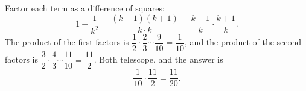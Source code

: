 Factor each term as a difference of squares:
\[
1-\dfrac{1}{k^2}=\dfrac{(k-1)(k+1)}{k\cdot k}=\dfrac{k-1}{k}\cdot\dfrac{k+1}{k}.
\]
The product of the first factors is $\dfrac{1}{2}\cdot\dfrac{2}{3}\cdots\dfrac{9}{10}=\dfrac{1}{10}$, and the product of the second factors is $\dfrac{3}{2}\cdot\dfrac{4}{3}\cdots\dfrac{11}{10}=\dfrac{11}{2}$. Both telescope, and the answer is
\[
\dfrac{1}{10}\cdot\dfrac{11}{2}=\boxed{\dfrac{11}{20}}.
\]
